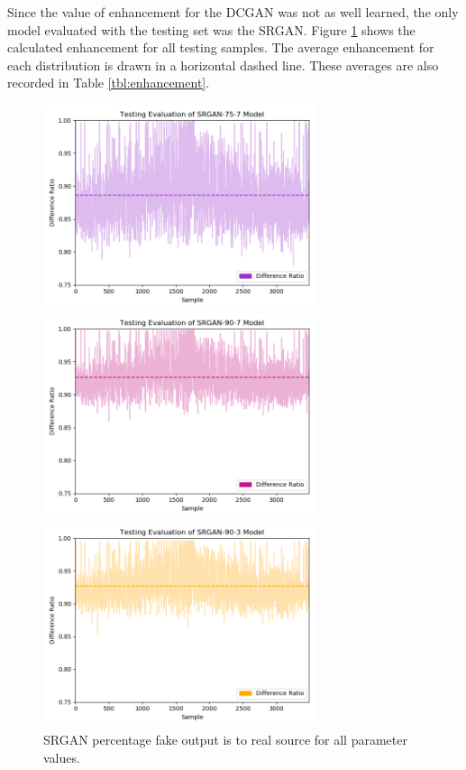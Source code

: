 \documentclass[letterpaper]{article} %
\begin{document}

Since the value of enhancement for the DCGAN was not as well learned,
the only model evaluated with the testing set was the SRGAN.
Figure \ref{fig:srgan_testing_separate} shows the calculated enhancement for
all testing samples. The average enhancement for each distribution is drawn in
a horizontal dashed line. These averages are also recorded in Table \ref{tbl:enhancement}.

\begin{figure}[htbp]
\centerline{\includegraphics[width=8cm]{testing_srgan_75-7.png}}
\centerline{\includegraphics[width=8cm]{testing_srgan_90-7.png}}
\centerline{\includegraphics[width=8cm]{testing_srgan_90-3.png}}
\caption{SRGAN percentage fake output is to real source for all parameter values.}
\label{fig:srgan_testing_separate}
\end{figure}
\end{document}
